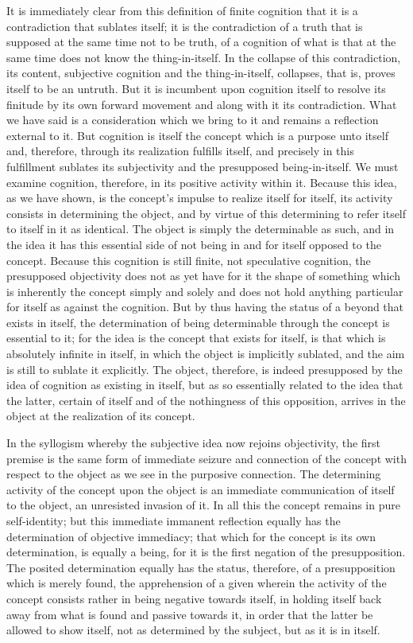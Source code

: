 It is immediately clear from this definition
of finite cognition that it is
a contradiction that sublates itself;
it is the contradiction of a truth that
is supposed at the same time not to be truth,
of a cognition of what is that at the same time
does not know the thing-in-itself.
In the collapse of this contradiction, its content,
subjective cognition and the thing-in-itself,
collapses, that is, proves itself to be an untruth.
But it is incumbent upon cognition itself to resolve
its finitude by its own forward movement
and along with it its contradiction.
What we have said is a consideration which
we bring to it and remains a reflection external to it.
But cognition is itself the concept
which is a purpose unto itself
and, therefore, through its
realization fulfills itself,
and precisely in this fulfillment
sublates its subjectivity
and the presupposed being-in-itself.
We must examine cognition, therefore,
in its positive activity within it.
Because this idea, as we have shown,
is the concept's impulse
to realize itself for itself,
its activity consists in determining the object,
and by virtue of this determining
to refer itself to itself in it as identical.
The object is simply the determinable as such,
and in the idea it has this essential side of
not being in and for itself opposed to the concept.
Because this cognition is still finite,
not speculative cognition,
the presupposed objectivity
does not as yet have for it
the shape of something
which is inherently the concept
simply and solely
and does not hold anything particular
for itself as against the cognition.
But by thus having the status of
a beyond that exists in itself,
the determination of being determinable
through the concept is essential to it;
for the idea is the concept
that exists for itself,
is that which is absolutely infinite in itself,
in which the object is implicitly sublated,
and the aim is still to sublate it explicitly.
The object, therefore, is indeed presupposed
by the idea of cognition as existing in itself,
but as so essentially related to the idea
that the latter, certain of itself
and of the nothingness of this opposition,
arrives in the object at the
realization of its concept.

In the syllogism whereby
the subjective idea now rejoins objectivity,
the first premise is the same form of
immediate seizure and connection of the concept
with respect to the object as
we see in the purposive connection.
The determining activity of the concept
upon the object is an immediate communication of
itself to the object, an unresisted invasion of it.
In all this the concept remains in pure self-identity;
but this immediate immanent reflection equally has
the determination of objective immediacy;
that which for the concept is its own determination,
is equally a being, for it is
the first negation of the presupposition.
The posited determination equally has the status,
therefore, of a presupposition which is merely found,
the apprehension of a given wherein the activity of
the concept consists rather in being negative towards itself,
in holding itself back away from what is found
and passive towards it,
in order that the latter be allowed to show itself,
not as determined by the subject,
but as it is in itself.

